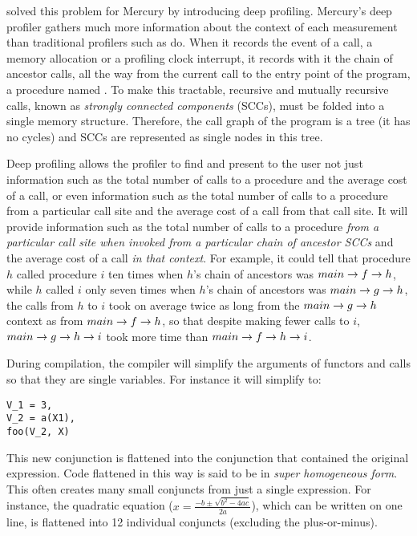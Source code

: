 \citep{conway:2001:mercury-deep}
solved this problem for Mercury by introducing deep profiling.
Mercury's deep profiler gathers much more information about the context of
each measurement than traditional profilers such as  \citep{gprof} do.
When it records the event of a call,
a memory allocation or a profiling clock interrupt,
it records with it the chain of ancestor calls,
all the way from the current call to the entry point of the program,
a procedure named .
To make this tractable,
recursive and mutually recursive calls,
known as \emph{strongly connected components} (SCCs),
must be folded into a single memory structure.
Therefore, the call graph of the program is a tree (it has no cycles)
and SCCs are represented as single nodes in this tree.

Deep profiling allows the profiler to find and present to the user
not just information such as the total number of calls to a procedure
and the average cost of a call,
or even information such as the total number of calls to a procedure
from a particular call site and the average cost of a call from that call
site.
It will provide information such as the total number of calls to a procedure
\emph{from a particular call site
when invoked from a particular chain of ancestor SCCs}
and the average cost of a call \emph{in that context}.
For example, it could tell that
procedure $h$ called procedure $i$ ten times
when $h$'s chain of ancestors was $main \rightarrow f \rightarrow h$,
while $h$ called $i$ only seven times
when $h$'s chain of ancestors was $main \rightarrow g \rightarrow h$,
the calls from $h$ to $i$ took on average twice as long
from the $main \rightarrow g \rightarrow h$ context as from $main \rightarrow f \rightarrow h$,
so that despite making fewer calls to $i$,
$main \rightarrow g \rightarrow h \rightarrow i$ took more time than $main \rightarrow f \rightarrow h \rightarrow i$.

During compilation, the compiler will simplify the arguments of functors and
calls so that they are single variables.
For instance it will simplify  to:

\begin{verbatim}
V_1 = 3,
V_2 = a(X1),
foo(V_2, X)
\end{verbatim}

\noindent
This new conjunction is flattened into the conjunction that contained the
original expression.
Code flattened in this way is said to be in
\emph{super homogeneous form}.
This often creates many small conjuncts from just a single expression.
For instance, the quadratic equation
($x=\frac{-b \pm \sqrt {b^2-4ac}}{2a}$), which can be written on one line,
is flattened into 12 individual conjuncts (excluding the plus-or-minus).

